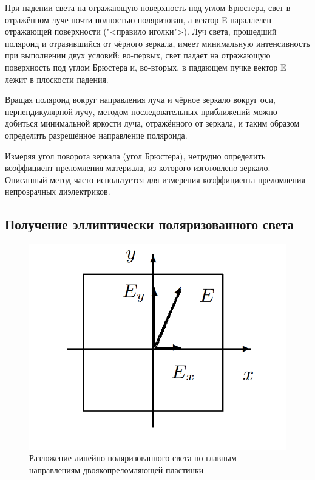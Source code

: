 \documentclass[a4paper, 12pt]{article}
\begin{document}
При падении света на отражающую поверхность под углом Брюстера, свет в отражённом луче почти полностью поляризован, а вектор E
параллелен отражающей поверхности ("<правило иголки">). Луч света,
прошедший поляроид и отразившийся от чёрного зеркала, имеет минимальную интенсивность при выполнении двух условий: во-первых, свет
падает на отражающую поверхность под углом Брюстера и, во-вторых,
в падающем пучке вектор E лежит в плоскости падения.

Вращая поляроид вокруг направления луча и чёрное зеркало вокруг
оси, перпендикулярной лучу, методом последовательных приближений
можно добиться минимальной яркости луча, отражённого от зеркала,
и таким образом определить разрешённое направление поляроида.

Измеряя угол поворота зеркала (угол Брюстера), нетрудно определить коэффициент преломления материала, из которого изготовлено
зеркало. Описанный метод часто используется для измерения коэффициента преломления непрозрачных диэлектриков.

\subsection{Получение эллиптически поляризованного света}
\begin{figure} 
	\includegraphics[width=\linewidth]{1.png}
	\caption{Разложение линейно поляризованного света по главным направлениям двоякопреломляющей пластинки}
	\label{ris 1}
\end{figure}
\end{document}
